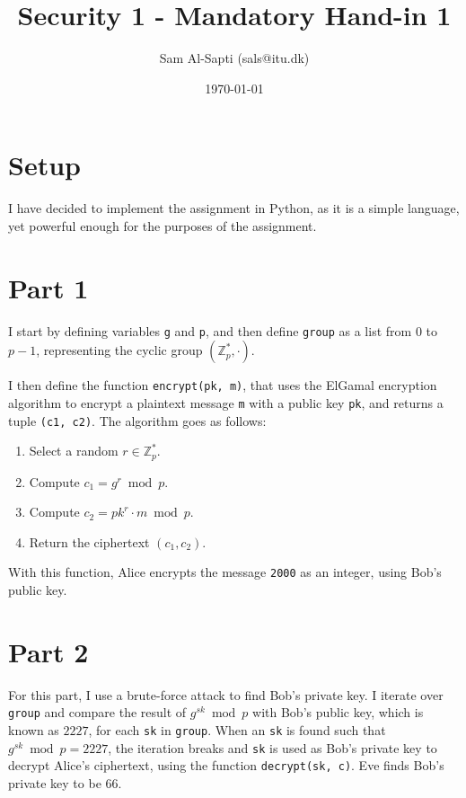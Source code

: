 \documentclass[12pt,a4paper]{article}
\title{Security 1 - Mandatory Hand-in 1}
\date{\today}
\author{Sam Al-Sapti (sals@itu.dk)}
\begin{document}
    \maketitle

    \section*{Setup}

    I have decided to implement the assignment in Python, as it is a simple
    language, yet powerful enough for the purposes of the assignment.
    
    \section*{Part 1}

    I start by defining variables \texttt{g} and \texttt{p}, and then define
    \texttt{group} as a list from $0$ to $p - 1$, representing the cyclic
    group $(\mathbb{Z}^*_p, \cdot)$.

    I then define the function \texttt{encrypt(pk, m)}, that uses the ElGamal
    encryption algorithm to encrypt a plaintext message \texttt{m} with a
    public key \texttt{pk}, and returns a tuple \texttt{(c1, c2)}. The
    algorithm goes as follows:

    \begin{enumerate}
        \item Select a random $r \in \mathbb{Z}^*_p$.
        \item Compute $c_1 = g^r \bmod p$.
        \item Compute $c_2 = {pk}^r \cdot m \bmod p$.
        \item Return the ciphertext $(c_1, c_2)$.
    \end{enumerate}

    With this function, Alice encrypts the message \texttt{2000} as an
    integer, using Bob's public key.

    \section*{Part 2}

    For this part, I use a brute-force attack to find Bob's private key. I
    iterate over \texttt{group} and compare the result of $g^{sk} \bmod p$
    with Bob's public key, which is known as $2227$, for each \texttt{sk} in
    \texttt{group}. When an \texttt{sk} is found such that $g^{sk} \bmod p =
    2227$, the iteration breaks and \texttt{sk} is used as Bob's private key
    to decrypt Alice's ciphertext, using the function \texttt{decrypt(sk, c)}.
    Eve finds Bob's private key to be $66$.
\end{document}
